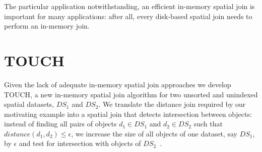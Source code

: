 \documentclass{vldb}
\newcommand{\SJ}{TOUCH}
\begin{document}
The particular application notwithstanding, an efficient in-memory spatial join is important for many applications: after all, every disk-based spatial
join needs to perform an in-memory join.



\section{\SJ}
\label{s_touch}
Given the lack of adequate in-memory spatial join approaches we develop {\SJ}, a new in-memory spatial join algorithm for two unsorted and unindexed spatial
datasets, $DS_1$ and $DS_2$. We translate the distance join required by our motivating example into a spatial join that detects intersection between objects:
instead of finding all pairs of objects $d_1 \in DS_1$ and $d_2 \in DS_2$ such that $distance(d_1, d_2) \leq \epsilon$, we increase the size of all objects of
one dataset, say $DS_1$, by $\epsilon$ and test for intersection with objects of $DS_2$~\cite{spatialjointechniques}.
\end{document}
